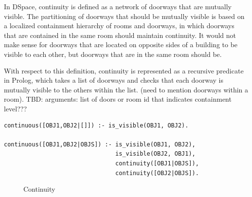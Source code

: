 \documentclass[12pt]{ucthesis}
\begin{document}
In DSpace, continuity is defined as a network of doorways that are mutually visible. The partitioning of doorways that should be mutually visible is based on a localized containment hierarchy of rooms and doorways, in which doorways that are contained in the same room should maintain continuity. It would not make sense for doorways that are located on opposite sides of a building to be visible to each other, but doorways that are in the same room should be. 

With respect to this definition, continuity is represented as a recursive predicate in Prolog, which takes a list of doorways and checks that each doorway is mutually visible to the others within the list. (need to mention doorways within a room). TBD: arguments: list of doors or room id that indicates containment level???

\begin{verbatim}
continuous([OBJ1,OBJ2|[]]) :- is_visible(OBJ1, OBJ2).

continuous([OBJ1,OBJ2|OBJS]) :- is_visible(OBJ1, OBJ2),
	                            is_visible(OBJ2, OBJ1),
                                continuity([OBJ1|OBJS]),
                                continuity([OBJ2|OBJS]).
\end{verbatim}

\begin{figure}[H]
 \centering
  \hspace{30 mm}
 \caption{Continuity}
\label{continuity}
\end{figure}
\end{document}
